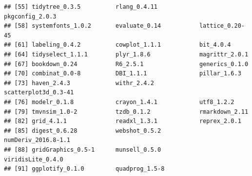 \documentclass[
  11pt,
]{article}
\begin{document}
\begin{verbatim}
## [55] tidytree_0.3.5          rlang_0.4.11            pkgconfig_2.0.3        
## [58] systemfonts_1.0.2       evaluate_0.14           lattice_0.20-45        
## [61] labeling_0.4.2          cowplot_1.1.1           bit_4.0.4              
## [64] tidyselect_1.1.1        plyr_1.8.6              magrittr_2.0.1         
## [67] bookdown_0.24           R6_2.5.1                generics_0.1.0         
## [70] combinat_0.0-8          DBI_1.1.1               pillar_1.6.3           
## [73] haven_2.4.3             withr_2.4.2             scatterplot3d_0.3-41   
## [76] modelr_0.1.8            crayon_1.4.1            utf8_1.2.2             
## [79] tmvnsim_1.0-2           tzdb_0.1.2              rmarkdown_2.11         
## [82] grid_4.1.1              readxl_1.3.1            reprex_2.0.1           
## [85] digest_0.6.28           webshot_0.5.2           numDeriv_2016.8-1.1    
## [88] gridGraphics_0.5-1      munsell_0.5.0           viridisLite_0.4.0      
## [91] ggplotify_0.1.0         quadprog_1.5-8
\end{verbatim}
\end{document}
